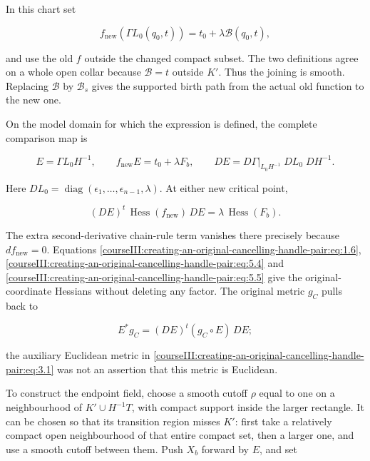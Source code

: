 In this chart set

\begin{equation}
f_{\mathrm{new}}(\Gamma L_0(q_0,t))
       =t_0+\lambda\mathcal B(q_0,t),
 \label{courseIII:creating-an-original-cancelling-handle-pair:eq:5.3}
\end{equation}

and use the old \(f\) outside the changed compact subset. The two definitions agree on a whole open collar because \(\mathcal B=t\) outside \(K'\). Thus the joining is smooth. Replacing \(\mathcal B\) by \(\mathcal B_s\) gives the supported birth path from the actual old function to the new one.

On the model domain for which the expression is defined, the complete comparison map is

\begin{equation}
E=\Gamma L_0 H^{-1},\qquad
 f_{\mathrm{new}}E=t_0+\lambda F_b,\qquad
 DE=D\Gamma|_{L_0H^{-1}}\;DL_0\;DH^{-1}.
 \label{courseIII:creating-an-original-cancelling-handle-pair:eq:5.4}
\end{equation}

Here \(DL_0=\operatorname{diag}(\epsilon_1,\ldots,\epsilon_{n-1},\lambda)\). At either new critical point,

\begin{equation}
(DE)^t\,\operatorname{Hess}(f_{\mathrm{new}})\,DE
     =\lambda\,\operatorname{Hess}(F_b).
 \label{courseIII:creating-an-original-cancelling-handle-pair:eq:5.5}
\end{equation}

The extra second-derivative chain-rule term vanishes there precisely because \(df_{\mathrm{new}}=0\). Equations \eqref{courseIII:creating-an-original-cancelling-handle-pair:eq:1.6}, \eqref{courseIII:creating-an-original-cancelling-handle-pair:eq:5.4} and \eqref{courseIII:creating-an-original-cancelling-handle-pair:eq:5.5} give the original-coordinate Hessians without deleting any factor. The original metric \(g_C\) pulls back to

\begin{equation}
E^*g_C=(DE)^t(g_C\circ E)\,DE;
 \label{courseIII:creating-an-original-cancelling-handle-pair:eq:5.6}
\end{equation}

the auxiliary Euclidean metric in \eqref{courseIII:creating-an-original-cancelling-handle-pair:eq:3.1} was not an assertion that this metric is Euclidean.

To construct the endpoint field, choose a smooth cutoff \(\rho\) equal to one on a neighbourhood of \(K'\cup H^{-1}T\), with compact support inside the larger rectangle. It can be chosen so that its transition region misses \(K'\): first take a relatively compact open neighbourhood of that entire compact set, then a larger one, and use a smooth cutoff between them. Push \(X_b\) forward by \(E\), and set


